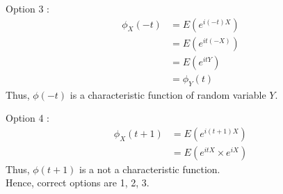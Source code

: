 \documentclass[journal,12pt,twocolumn]{IEEEtran}
\begin{document}
Option 3 :\begin{align*} \phi_X(-t) &= E(e^{i(-t)X}) \\
                &= E(e^{it(-X)}) \\
                &= E(e^{itY})\\
                &= \phi_Y(t)
\end{align*}
Thus, $\phi(-t)$ is a characteristic function of random variable $Y$.

Option 4 :\begin{align*} \phi_X(t+1) &= E(e^{i(t+1)X}) \\
&= E(e^{itX}\times e^{iX}) 
\end{align*}
Thus, $\phi(t+1)$ is a not a characteristic function.\\

Hence, correct options are 1, 2, 3.
\end{document}
